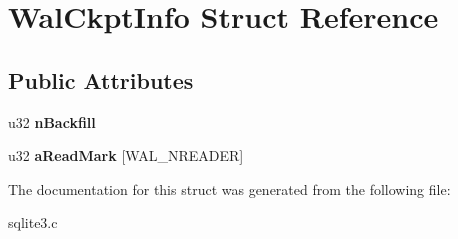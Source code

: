 \hypertarget{struct_wal_ckpt_info}{\section{Wal\-Ckpt\-Info Struct Reference}
\label{struct_wal_ckpt_info}
}
\subsection*{Public Attributes}
\begin{DoxyCompactItemize}
\item 
\hypertarget{struct_wal_ckpt_info_a5185e508f7da44c391b692e957a84ff6}{u32 {\bfseries n\-Backfill}}\label{struct_wal_ckpt_info_a5185e508f7da44c391b692e957a84ff6}

\item 
\hypertarget{struct_wal_ckpt_info_a3bc01a8244045941d5f59f01123a7735}{u32 {\bfseries a\-Read\-Mark} \mbox{[}W\-A\-L\-\_\-\-N\-R\-E\-A\-D\-E\-R\mbox{]}}\label{struct_wal_ckpt_info_a3bc01a8244045941d5f59f01123a7735}

\end{DoxyCompactItemize}


The documentation for this struct was generated from the following file\-:\begin{DoxyCompactItemize}
\item 
sqlite3.\-c\end{DoxyCompactItemize}
